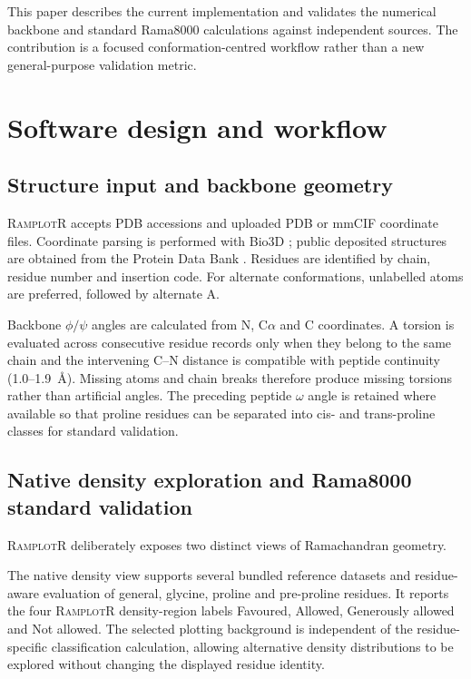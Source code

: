\documentclass[11pt]{article}
\newcommand{\ramplotr}{\textsc{RamplotR}\xspace}
\begin{document}
This paper describes the current implementation and validates the numerical backbone and standard Rama8000 calculations against independent sources. The contribution is a focused conformation-centred workflow rather than a new general-purpose validation metric.

\section{Software design and workflow}

\subsection{Structure input and backbone geometry}

\ramplotr accepts PDB accessions and uploaded PDB or mmCIF coordinate files. Coordinate parsing is performed with Bio3D \citep{Grant2006}; public deposited structures are obtained from the Protein Data Bank \citep{Burley2019}. Residues are identified by chain, residue number and insertion code. For alternate conformations, unlabelled atoms are preferred, followed by alternate A.

Backbone $\phi/\psi$ angles are calculated from N, C$\alpha$ and C coordinates. A torsion is evaluated across consecutive residue records only when they belong to the same chain and the intervening C--N distance is compatible with peptide continuity (1.0--1.9~\AA). Missing atoms and chain breaks therefore produce missing torsions rather than artificial angles. The preceding peptide $\omega$ angle is retained where available so that proline residues can be separated into cis- and trans-proline classes for standard validation.

\subsection{Native density exploration and Rama8000 standard validation}

\ramplotr deliberately exposes two distinct views of Ramachandran geometry.

The native density view supports several bundled reference datasets and residue-aware evaluation of general, glycine, proline and pre-proline residues. It reports the four \ramplotr density-region labels Favoured, Allowed, Generously allowed and Not allowed. The selected plotting background is independent of the residue-specific classification calculation, allowing alternative density distributions to be explored without changing the displayed residue identity.
\end{document}

